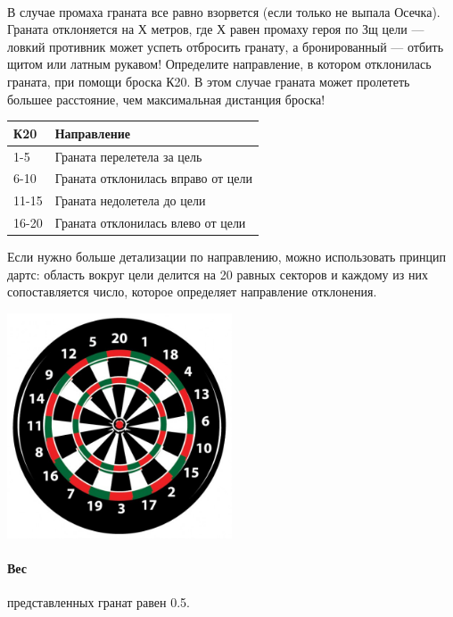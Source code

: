 \paragraph{}
В случае промаха граната все равно взорвется (если только не выпала Осечка). Граната отклоняется на Х метров, где Х равен промаху героя по Зщ цели — ловкий противник может успеть отбросить гранату, а бронированный — отбить щитом или латным рукавом! Определите направление, в котором отклонилась граната, при помощи броска К20. В этом случае граната может пролететь большее расстояние, чем максимальная дистанция броска!
\begin{center}
\begin{tabular}{ |p{2.7cm}|p{12cm}| }
\hline
\textbf{К20} & \textbf{Направление}
\\ \hline
1-5 & Граната перелетела за цель
\\ \hline
6-10 & Граната отклонилась вправо от цели
\\ \hline
11-15 & Граната недолетела до цели
\\ \hline
16-20 & Граната отклонилась влево от цели
\\ \hline
\end{tabular}
\end{center}
\begin{tcolorbox}
Если нужно больше детализации по направлению, можно использовать принцип дартс: область вокруг цели делится на 20 равных секторов и каждому из них сопоставляется число, которое определяет направление отклонения.
\newline
\begin{center}
\includegraphics[width=0.5\textwidth]{darts}
\end{center}
\end{tcolorbox}
\paragraph{Вес} представленных гранат равен 0.5.
